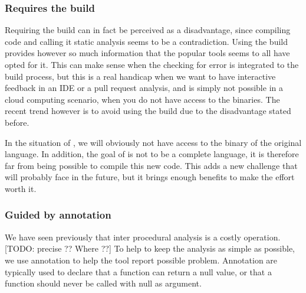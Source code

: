 \subsubsection{Requires the build}
\label{subsubsec:require_build}

Requiring the build can in fact be perceived as a disadvantage, since compiling code and calling it static analysis seems to be a contradiction. 
Using the build provides however so much information that the popular tools seems to all have opted for it. 
This can make sense when the checking for error is integrated to the build process, but this is a real handicap when we want to have interactive feedback in an IDE or a pull request analysis, and is simply not possible in a cloud computing scenario, when you do not have access to the binaries. 
The recent trend however is to avoid using the build due to the disadvantage stated before.

In the situation of \slang, we will obviously not have access to the binary of the original language. 
In addition, the goal of \slang is not to be a complete language, it is therefore far from being possible to compile this new code. 
This adds a new challenge that \slang will probably face in the future, but it brings enough benefits to make the effort worth it.

\subsubsection{Guided by annotation}
\label{subsubsec:guided_by_annotation}

We have seen previously that inter procedural analysis is a costly operation.
[TODO: precise ?? Where ??] 
To help to keep the analysis as simple as possible, we use annotation to help the tool report possible problem. Annotation are typically used to declare that a function can return a null value, or that a function should never be called with null as argument.




